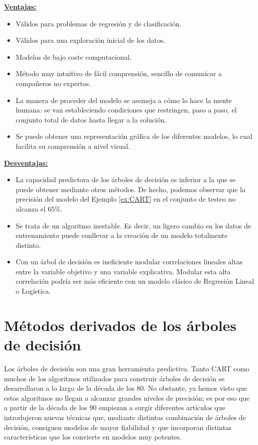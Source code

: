 \documentclass[12pt,twoside]{article}
\begin{document}
\textbf{\underline{Ventajas:}}
\begin{itemize}
\item Válidos para problemas de regresión y de clasificación.
\item Válidos para una exploración inicial de los datos.
\item Modelos de bajo coste computacional.
\item Método muy intuitivo de fácil comprensión, sencillo de comunicar a compañeros no expertos.
\item La manera de proceder del modelo se asemeja a cómo lo hace la mente humana: se van estableciendo condiciones que restringen, paso a paso, el conjunto total de datos hasta llegar a la solución.
\item Se puede obtener una representación gráfica de los diferentes modelos, lo cual facilita su comprensión a nivel visual.
\end{itemize}

\textbf{\underline{Desventajas:}}
\begin{itemize}
\item La capacidad predictora de los árboles de decisión es inferior a la que se puede obtener mediante otros métodos. De hecho, podemos observar que la precisión del modelo del Ejemplo \ref{ex:CART} en el conjunto de testeo no alcanza el $65\%$.
\item Se trata de un algoritmo inestable. Es decir, un ligero cambio en los datos de entrenamiento puede conllevar a la creación de un modelo totalmente distinto. %
\item Con un árbol de decisión es ineficiente modular correlaciones lineales altas entre la variable objetivo y una variable explicativa. Modular esta alta correlación podría ser más eficiente con un modelo clásico de Regresión Lineal o Logística.
\end{itemize}





\newpage
\section{Métodos derivados de los árboles de decisión}
Los árboles de decisión son una gran herramienta predictiva. Tanto CART como muchos de los algoritmos utilizados para construir árboles de decisión se desarrollaron a lo largo de la década de los 80. No obstante, ya hemos visto que estos algoritmos no llegan a alcanzar grandes niveles de precisión; es por eso que a partir de la década de los 90 empiezan a surgir diferentes artículos que introdujeron nuevas técnicas que, mediante distintas combinación de árboles de decisión, consiguen modelos de mayor fiabilidad y que incorporan distintas características que los convierte en modelos muy potentes.
\end{document}
